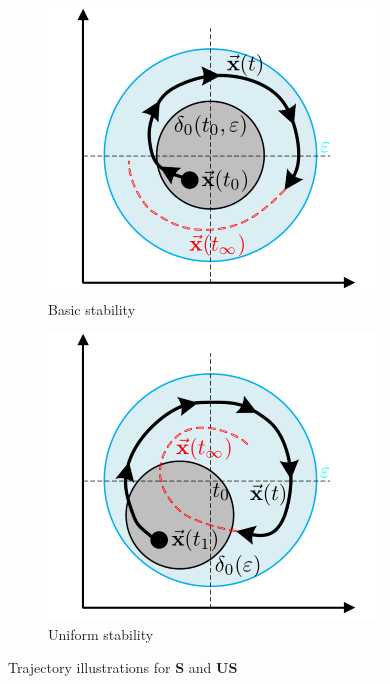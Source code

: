 \begin{figure}[hbtp]
\vspace{-6pt}
\centering
\begin{subfigure}{0.49\textwidth}
\centering
\includegraphics[width=\textwidth]{figs/basic-stability}
\vspace{-16pt}
\caption{Basic stability}
\label{fig:basic-stability}
\end{subfigure}
\begin{subfigure}{0.49\textwidth}
\centering
\includegraphics[width=\textwidth]{figs/uniform-stability}
\vspace{-16pt}
\caption{Uniform stability}
\label{fig:uniform-stability}
\end{subfigure}
\vspace{-8pt}
\caption{Trajectory illustrations for $\mathbf{S}$ and $\mathbf{US}$}
\vspace{-18pt}
\end{figure}
